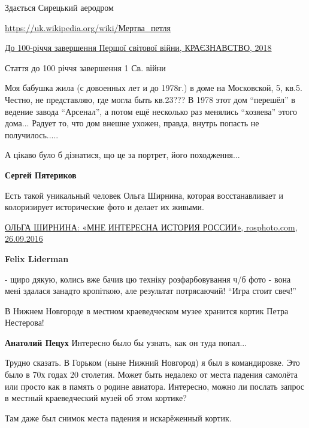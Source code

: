 \begin{itemize}
\begin{itemize} %
Здається Сирецький аеродром

\url{https://uk.wikipedia.org/wiki/Мертва_петля}

\href{https://dimlzapovidnuk.files.wordpress.com/2019/04/d09ad180d0b0d194d0b7d0bdd0b0d0b2d181d182d0b2d0be_4-2018.pdf}{%
До 100-річчя завершення Першої світової війни, КРАЄЗНАВСТВО, 2018}

Стаття до 100 річчя завершення 1 Св. війни

\end{itemize} %


Моя бабушка жила (с довоенных лет и до 1978г.) в доме на Московской, 5, кв.5.
Честно, не представляю, где могла быть кв.23??? В 1978 этот дом \enquote{перешёл} в
ведение завода \enquote{Арсенал}, а потом ещё несколько раз менялись \enquote{хозяева} этого
дома... Радует то, что дом внешне ухожен, правда, внутрь попасть не
получилось.....


А цікаво було б дізнатися, що це за портрет, його походження...

\begin{itemize} %
\textbf{Сергей Пятериков} 

Есть такой уникальный человек Ольга Ширнина, которая восстанавливает и
колоризирует исторические фото и делает их живыми.

\href{https://rosphoto.com/history/klimbim-5276}{%
ОЛЬГА ШИРНИНА: «МНЕ ИНТЕРЕСНА ИСТОРИЯ РОССИИ», rosphoto.com, 26.09.2016%
}

\textbf{Felix Liderman} 

- щиро дякую, колись вже бачив цю техніку розфарбовування ч/б фото - вона мені
здалася занадто кропіткою, але результат потрясаючий! \enquote{Игра стоит свеч!}

\end{itemize} %


В Нижнем Новгороде в местном краеведческом музее хранится кортик Петра
Нестерова!

\begin{itemize} %
\textbf{Анатолий Пецух} Интересно было бы узнать, как он туда попал...


Трудно сказать. В Горьком (ныне Нижний Новгород) я был в командировке. Это было в
70х годах 20 столетия. Может быть недалеко от места падения самолёта или просто
как в память о родине авиатора. Интересно, можно ли послать запрос в местный
краеведческий музей об этом кортике?

Там даже был снимок места падения и искарёженный кортик.
\end{itemize} %

\end{itemize} %

